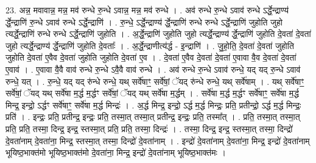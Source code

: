 \documentclass[17pt]{extarticle}
\begin{document}
23. अन्न॒ मवावान्न॒ मन्न॒ मव॑ रुन्धे रु॒न्धे ऽवान्न॒ मन्न॒ मव॑ रुन्धे । . अव॑ रुन्धे रु॒न्धे ऽवाव॑ रुन्धे ऽर्द्धे॒न्द्राण्य॑ र्द्धे॒न्द्राणि॑ रु॒न्धे ऽवाव॑ रुन्धे ऽर्द्धे॒न्द्राणि॑ । . रु॒न्धे॒ ऽर्द्धे॒न्द्राण्य॑ र्द्धे॒न्द्राणि॑ रुन्धे रुन्धे ऽर्द्धे॒न्द्राणि॑ जुहोति जुहो त्यर्द्धे॒न्द्राणि॑ रुन्धे रुन्धे ऽर्द्धे॒न्द्राणि॑ जुहोति । . अ॒र्द्धे॒न्द्राणि॑ जुहोति जुहो त्यर्द्धे॒न्द्राण्य॑ र्द्धे॒न्द्राणि॑ जुहोति दे॒वता॑ दे॒वता॑ जुहो त्यर्द्धे॒न्द्राण्य॑ र्द्धे॒न्द्राणि॑ जुहोति दे॒वताः᳚ । . अ॒र्द्धे॒न्द्राणीत्य॑र्द्ध - इ॒न्द्राणि॑ । . जु॒हो॒ति॒ दे॒वता॑ दे॒वता॑ जुहोति जुहोति दे॒वता॑ ए॒वैव दे॒वता॑ जुहोति जुहोति दे॒वता॑ ए॒व । . दे॒वता॑ ए॒वैव दे॒वता॑ दे॒वता॑ ए॒वावा वै॒व दे॒वता॑ दे॒वता॑ ए॒वाव॑ । . ए॒वावा वै॒वै वाव॑ रुन्धे रु॒न्धे ऽवै॒वै वाव॑ रुन्धे । . अव॑ रुन्धे रु॒न्धे ऽवाव॑ रुन्धे॒ यद् यद् रु॒न्धे ऽवाव॑ रुन्धे॒ यत् । . रु॒न्धे॒ यद् यद् रु॑न्धे रुन्धे॒ यथ् सर्वे॑षाꣳ॒॒ सर्वे॑षां॒ ॅयद् रु॑न्धे रुन्धे॒ यथ् सर्वे॑षाम् । . यथ् सर्वे॑षाꣳ॒॒ सर्वे॑षां॒ ॅयद् यथ् सर्वे॑षा म॒र्द्ध म॒र्द्धꣳ सर्वे॑षां॒ ॅयद् यथ् सर्वे॑षा म॒र्द्धम् । . सर्वे॑षा म॒र्द्ध म॒र्द्धꣳ सर्वे॑षाꣳ॒॒ सर्वे॑षा म॒र्द्ध मिन्द्र॒ इन्द्रो॒ ऽर्द्धꣳ सर्वे॑षाꣳ॒॒ सर्वे॑षा म॒र्द्ध मिन्द्रः॑ । . अ॒र्द्ध मिन्द्र॒ इन्द्रो॒ ऽर्द्ध म॒र्द्ध मिन्द्रः॒ प्रति॒ प्रतीन्द्रो॒ ऽर्द्ध म॒र्द्ध मिन्द्रः॒ प्रति॑ । . इन्द्रः॒ प्रति॒ प्रतीन्द्र॒ इन्द्रः॒ प्रति॒ तस्मा॒त् तस्मा॒त् प्रतीन्द्र॒ इन्द्रः॒ प्रति॒ तस्मा᳚त् । . प्रति॒ तस्मा॒त् तस्मा॒त् प्रति॒ प्रति॒ तस्मा॒ दिन्द्र॒ इन्द्र॒ स्तस्मा॒त् प्रति॒ प्रति॒ तस्मा॒ दिन्द्रः॑ । . तस्मा॒ दिन्द्र॒ इन्द्र॒ स्तस्मा॒त् तस्मा॒ दिन्द्रो॑ दे॒वता॑नाम् दे॒वता॑ना॒ मिन्द्र॒ स्तस्मा॒त् तस्मा॒ दिन्द्रो॑ दे॒वता॑नाम् । . इन्द्रो॑ दे॒वता॑नाम् दे॒वता॑ना॒ मिन्द्र॒ इन्द्रो॑ दे॒वता॑नाम् भूयिष्ठ॒भाक्त॑मो भूयिष्ठ॒भाक्त॑मो दे॒वता॑ना॒ मिन्द्र॒ इन्द्रो॑ दे॒वता॑नाम् भूयिष्ठ॒भाक्त॑मः । \newline
\end{document}
